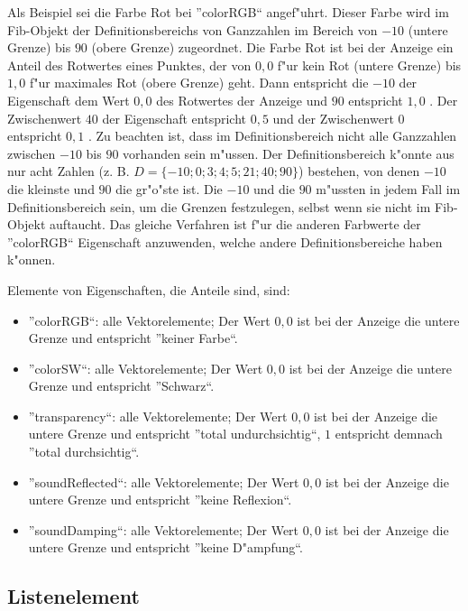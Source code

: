 Als Beispiel sei die Farbe Rot bei ''colorRGB`` angef"uhrt. Dieser Farbe wird im Fib-Objekt der Definitionsbereichs von Ganzzahlen im Bereich von $-10$ (untere Grenze) bis $90$ (obere Grenze) zugeordnet. Die Farbe Rot ist bei der Anzeige ein Anteil des Rotwertes eines Punktes, der von $0{,}0$ f"ur kein Rot (untere Grenze) bis $1{,}0$ f"ur maximales Rot (obere Grenze) geht. Dann entspricht die $-10$ der Eigenschaft dem Wert $0{,}0$ des Rotwertes der Anzeige und $90$ entspricht $1{,}0$ . Der Zwischenwert $40$ der Eigenschaft entspricht $0{,}5$ und der Zwischenwert $0$ entspricht $0{,}1$ . Zu beachten ist, dass im Definitionsbereich nicht alle Ganzzahlen zwischen $-10$ bis $90$ vorhanden sein m"ussen. Der Definitionsbereich k"onnte aus nur acht Zahlen (z. B. $D=\{-10; 0; 3; 4; 5; 21; 40;90\}$) bestehen, von denen $-10$ die kleinste und $90$ die gr"o"ste ist. Die $-10$ und die $90$ m"ussten in jedem Fall im Definitionsbereich sein, um die Grenzen festzulegen, selbst wenn sie nicht im Fib-Objekt auftaucht.
Das gleiche Verfahren ist f"ur die anderen Farbwerte der ''colorRGB`` Eigenschaft anzuwenden, welche andere Definitionsbereiche haben k"onnen.

\bigskip\noindent
Elemente von Eigenschaften, die Anteile sind, sind:
\begin{itemize}
 \item ''colorRGB``: alle Vektorelemente; Der Wert $0{,}0$ ist bei der Anzeige die untere Grenze und entspricht ''keiner Farbe``.
 \item ''colorSW``: alle Vektorelemente; Der Wert $0{,}0$ ist bei der Anzeige die untere Grenze und entspricht ''Schwarz``.
 \item ''transparency``: alle Vektorelemente; Der Wert $0{,}0$ ist bei der Anzeige die untere Grenze und entspricht ''total undurchsichtig``, $1$ entspricht demnach ''total durchsichtig``.
 \item ''soundReflected``: alle Vektorelemente; Der Wert $0{,}0$ ist bei der Anzeige die untere Grenze und entspricht ''keine Reflexion``.
 \item ''soundDamping``: alle Vektorelemente; Der Wert $0{,}0$ ist bei der Anzeige die untere Grenze und entspricht ''keine D"ampfung``.
\end{itemize}



\subsection{Listenelement}
\label{fibList}

